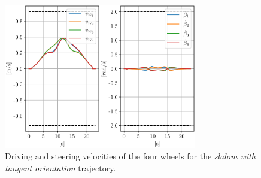 \begin{figure}
    \centering
    \includegraphics[width=0.75\textwidth]{figures/SWMR/simulations/slalom_with_tangent_orientation/wheels_velocities.pdf}
    \caption{Driving and steering velocities of the four wheels for the
        \textit{slalom with tangent orientation} trajectory.
    }
    \label{fig:simulations:slalom-with-tangent-orientation:wheel-velocities}
\end{figure}
